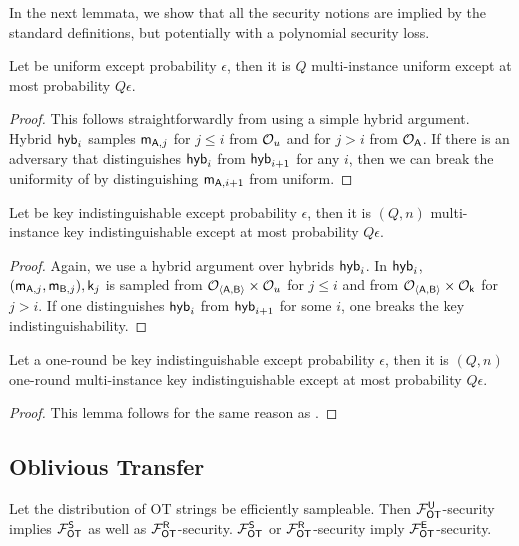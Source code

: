 In the next lemmata, we show that all the security notions are implied by the standard definitions, but potentially with a polynomial security loss.
 
\begin{lemma}\label{lem:multuniform}
Let \UKA be uniform except probability $\epsilon$, then it is $Q$ multi-instance uniform except at most probability $Q\epsilon$.
\end{lemma}
\begin{proof}
This follows straightforwardly from using a simple hybrid argument. Hybrid $\mathsf{hyb}_{i}$ samples $\mathsf{m}_{\mathsf{A},j}$ for $j\leq i$ from $\mathcal{O}_u$ and for $j>i$ from $\mathcal{O}_{\mathsf{A}}$. If there is an adversary that distinguishes $\mathsf{hyb}_i$ from $\mathsf{hyb}_{i+1}$ for any $i$, then we can break the uniformity of \UKA by distinguishing $\mathsf{m}_{\mathsf{A},i+1}$ from uniform.  
\pe
\end{proof}

\begin{lemma}\label{lem:keytomultkey}
Let \UKA be key indistinguishable except probability $\epsilon$, then it is $(Q,n)$ multi-instance key indistinguishable except at most probability $Q\epsilon$. 
\end{lemma}

\begin{proof}
Again, we use a hybrid argument over hybrids $\mathsf{hyb}_i$. In $\mathsf{hyb}_i$, $(\mathsf{m}_{\mathsf{A},j},\mathsf{m}_{\mathsf{B},j}),\mathsf{k}_j$ is sampled from $\mathcal{O}_{\langle \mathsf{A},\mathsf{B}\rangle}\times\mathcal{O}_u$ for $j\leq i$ and from $\mathcal{O}_{\langle \mathsf{A},\mathsf{B}\rangle}\times\mathcal{O}_\mathsf{k}$ for $j>i$. If one distinguishes $\mathsf{hyb}_i$ from $\mathsf{hyb}_{i+1}$ for some $i$, one breaks the key indistinguishability. 
\pe
\end{proof}

\begin{lemma}\label{lem:oneroundkeytomultkey}
Let a one-round \UKA be key indistinguishable except probability $\epsilon$, then it is $(Q,n)$ one-round multi-instance key indistinguishable except at most probability $Q\epsilon$. 
\end{lemma}

\begin{proof}
This lemma follows for the same reason as .
\pe
\end{proof}


\subsection{Oblivious Transfer}\label{sec:addOT}


\begin{lemma}\label{lemma:is_a_repeat}
	Let the distribution of OT strings be efficiently sampleable. 
	Then $\mathcal{F}_{\mathsf{OT}}^\mathsf{U}$-security implies $\mathcal{F}_{\mathsf{OT}}^{\mathsf{S}}$ as well as $\mathcal{F}_{\mathsf{OT}}^\mathsf{R}$-security. $\mathcal{F}_{\mathsf{OT}}^{\mathsf{S}}$ or $\mathcal{F}_{\mathsf{OT}}^\mathsf{R}$-security imply $\mathcal{F}_{\mathsf{OT}}^\mathsf{E}$-security.
\end{lemma}



